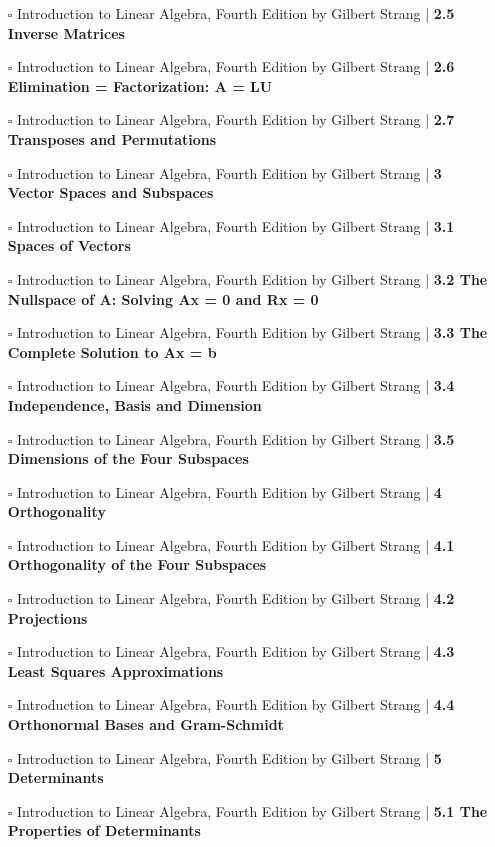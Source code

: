 \documentclass[a4, landscape, 12pt]{article}
\newcommand{\checkbox}{$\square$}%
\begin{document}
\begin{itemize}
{}
\item [\checkbox] Introduction to Linear Algebra, Fourth Edition by Gilbert Strang  | \textbf{2.5 Inverse Matrices
}
\item [\checkbox] Introduction to Linear Algebra, Fourth Edition by Gilbert Strang  | \textbf{2.6 Elimination = Factorization: A = LU
}
\item [\checkbox] Introduction to Linear Algebra, Fourth Edition by Gilbert Strang  | \textbf{2.7 Transposes and Permutations
}
\item [\checkbox] Introduction to Linear Algebra, Fourth Edition by Gilbert Strang  | \textbf{3 Vector Spaces and Subspaces
}
\item [\checkbox] Introduction to Linear Algebra, Fourth Edition by Gilbert Strang  | \textbf{3.1 Spaces of Vectors
}
\item [\checkbox] Introduction to Linear Algebra, Fourth Edition by Gilbert Strang  | \textbf{3.2 The Nullspace of A: Solving Ax = 0 and Rx = 0
}
\item [\checkbox] Introduction to Linear Algebra, Fourth Edition by Gilbert Strang  | \textbf{3.3 The Complete Solution to Ax = b
}
\item [\checkbox] Introduction to Linear Algebra, Fourth Edition by Gilbert Strang  | \textbf{3.4 Independence, Basis and Dimension
}
\item [\checkbox] Introduction to Linear Algebra, Fourth Edition by Gilbert Strang  | \textbf{3.5 Dimensions of the Four Subspaces
}
\item [\checkbox] Introduction to Linear Algebra, Fourth Edition by Gilbert Strang  | \textbf{4 Orthogonality
}
\item [\checkbox] Introduction to Linear Algebra, Fourth Edition by Gilbert Strang  | \textbf{4.1 Orthogonality of the Four Subspaces
}
\item [\checkbox] Introduction to Linear Algebra, Fourth Edition by Gilbert Strang  | \textbf{4.2 Projections
}
\item [\checkbox] Introduction to Linear Algebra, Fourth Edition by Gilbert Strang  | \textbf{4.3 Least Squares Approximations
}
\item [\checkbox] Introduction to Linear Algebra, Fourth Edition by Gilbert Strang  | \textbf{4.4 Orthonormal Bases and Gram-Schmidt
}
\item [\checkbox] Introduction to Linear Algebra, Fourth Edition by Gilbert Strang  | \textbf{5 Determinants
}
\item [\checkbox] Introduction to Linear Algebra, Fourth Edition by Gilbert Strang  | \textbf{5.1 The Properties of Determinants
}
\end{itemize}
\end{document}
